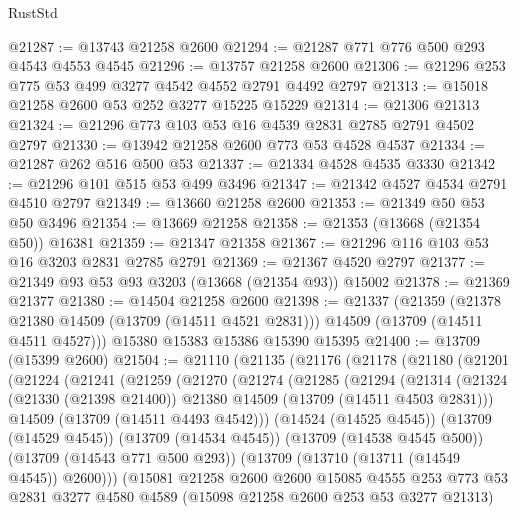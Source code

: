 \begin{lexlean}{RustStd}
\begin{coremodule}
@21287 := @13743 @21258 @2600
@21294 := @21287 @771 @776 @500 @293 @4543 @4553 @4545
@21296 := @13757 @21258 @2600
@21306 := @21296 @253 @775 @53 @499 @3277 @4542 @4552 @2791 @4492 @2797
@21313 := @15018 @21258 @2600 @53 @252 @3277 @15225 @15229
@21314 := @21306 @21313
@21324 := @21296 @773 @103 @53 @16 @4539 @2831 @2785 @2791 @4502 @2797
@21330 := @13942 @21258 @2600 @773 @53 @4528 @4537
@21334 := @21287 @262 @516 @500 @53
@21337 := @21334 @4528 @4535 @3330
@21342 := @21296 @101 @515 @53 @499 @3496
@21347 := @21342 @4527 @4534 @2791 @4510 @2797
@21349 := @13660 @21258 @2600
@21353 := @21349 @50 @53 @50 @3496
@21354 := @13669 @21258
@21358 := @21353 (@13668 (@21354 @50)) @16381
@21359 := @21347 @21358
@21367 := @21296 @116 @103 @53 @16 @3203 @2831 @2785 @2791
@21369 := @21367 @4520 @2797
@21377 := @21349 @93 @53 @93 @3203 (@13668 (@21354 @93)) @15002
@21378 := @21369 @21377
@21380 := @14504 @21258 @2600
@21398 := @21337
    (@21359
      (@21378 @21380 @14509 (@13709 (@14511 @4521 @2831)))
      @14509
      (@13709 (@14511 @4511 @4527)))
    @15380
    @15383
    @15386
    @15390
    @15395
@21400 := @13709 (@15399 @2600)
@21504 := @21110
    (@21135
      (@21176
        (@21178
          (@21180
            (@21201
              (@21224
                (@21241
                  (@21259
                    (@21270
                      (@21274
                        (@21285
                          (@21294
                            (@21314
                              (@21324
                                (@21330 (@21398 @21400))
                                @21380
                                @14509
                                (@13709 (@14511 @4503 @2831)))
                              @14509
                              (@13709 (@14511 @4493 @4542)))
                            (@14524 (@14525 @4545))
                            (@13709 (@14529 @4545))
                            (@13709 (@14534 @4545))
                            (@13709 (@14538 @4545 @500))
                            (@13709 (@14543 @771 @500 @293))
                            (@13709 (@13710 (@13711 (@14549 @4545)) @2600)))
                          (@15081
                            @21258
                            @2600
                            @2600
                            @15085
                            @4555
                            @253
                            @773
                            @53
                            @2831
                            @3277
                            @4580
                            @4589
                            (@15098 @21258 @2600 @253 @53 @3277 @21313)

\end{coremodule}
\end{lexlean}
